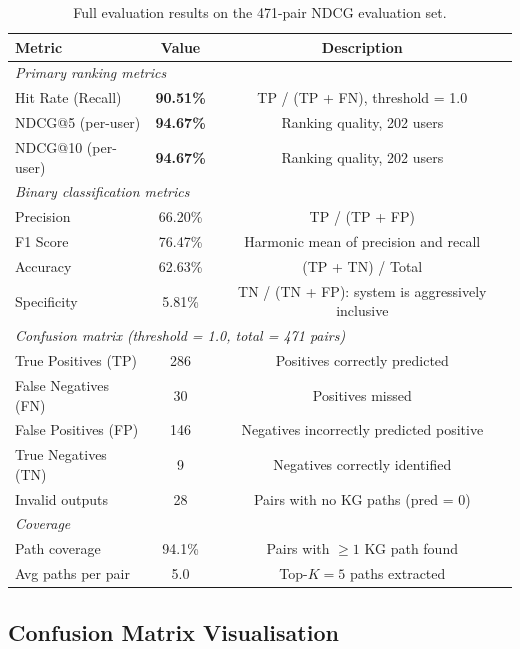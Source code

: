 \documentclass[12pt,a4paper]{article}
\begin{document}
\begin{table}[h]
\centering
\caption{Full evaluation results on the 471-pair NDCG evaluation set.}
\label{tab:results}
\begin{tabular}{lcc}
\toprule
\textbf{Metric} & \textbf{Value} & \textbf{Description} \\
\midrule
\multicolumn{3}{l}{\textit{Primary ranking metrics}} \\
\midrule
Hit Rate (Recall)   & \textbf{90.51\%} & TP / (TP + FN), threshold = 1.0 \\
NDCG@5 (per-user)   & \textbf{94.67\%} & Ranking quality, 202 users \\
NDCG@10 (per-user)  & \textbf{94.67\%} & Ranking quality, 202 users \\
\midrule
\multicolumn{3}{l}{\textit{Binary classification metrics}} \\
\midrule
Precision           & 66.20\%  & TP / (TP + FP)  \\
F1 Score            & 76.47\%  & Harmonic mean of precision and recall \\
Accuracy            & 62.63\%  & (TP + TN) / Total \\
Specificity         & 5.81\%   & TN / (TN + FP): system is aggressively inclusive  \\
\midrule
\multicolumn{3}{l}{\textit{Confusion matrix (threshold = 1.0, total = 471 pairs)}} \\
\midrule
True Positives  (TP)    & 286   & Positives correctly predicted \\
False Negatives (FN)    & 30    & Positives missed \\
False Positives (FP)    & 146   & Negatives incorrectly predicted positive \\
True Negatives  (TN)    & 9     & Negatives correctly identified \\
Invalid outputs         & 28    & Pairs with no KG paths (pred = 0) \\
\midrule
\multicolumn{3}{l}{\textit{Coverage}} \\
\midrule
Path coverage           & 94.1\% & Pairs with $\geq 1$ KG path found \\
Avg paths per pair      & 5.0    & Top-$K = 5$ paths extracted \\
\bottomrule
\end{tabular}
\end{table}

\subsection{Confusion Matrix Visualisation}
\end{document}
